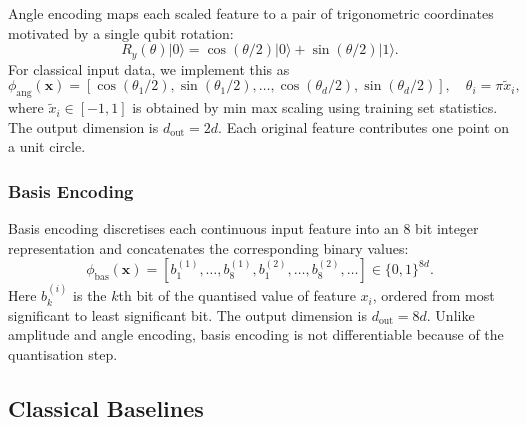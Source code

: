 \documentclass[12pt]{article}
\newcommand{\dout}{d_{\mathrm{out}}}
\begin{document}
Angle encoding maps each scaled feature to a pair of trigonometric coordinates
motivated by a single qubit rotation:
\begin{equation}
  R_y(\theta)|0\rangle =
  \cos(\theta/2)|0\rangle + \sin(\theta/2)|1\rangle.
\end{equation}
For classical input data, we implement this as
\begin{equation}
  \phi_{\mathrm{ang}}(\mathbf{x}) =
  [\cos(\theta_1/2),\sin(\theta_1/2),\ldots,
   \cos(\theta_d/2),\sin(\theta_d/2)],
  \quad \theta_i = \pi \tilde{x}_i,
  \label{eq:angle}
\end{equation}
where $\tilde{x}_i\in[-1,1]$ is obtained by min max scaling using training set
statistics. The output dimension is $\dout = 2d$. Each original feature
contributes one point on a unit circle.

\subsubsection{Basis Encoding}

Basis encoding discretises each continuous input feature into an $8$ bit
integer representation and concatenates the corresponding binary values:
\begin{equation}
  \phi_{\mathrm{bas}}(\mathbf{x}) =
    [b_1^{(1)},\ldots,b_8^{(1)},
     b_1^{(2)},\ldots,b_8^{(2)},\ldots]
    \in \{0,1\}^{8d}.
  \label{eq:basis}
\end{equation}
Here $b_k^{(i)}$ is the $k$th bit of the quantised value of feature $x_i$,
ordered from most significant to least significant bit. The output dimension is
$\dout=8d$. Unlike amplitude and angle encoding, basis encoding is not
differentiable because of the quantisation step.

\subsection{Classical Baselines}
\label{sec:baselines}
\end{document}
